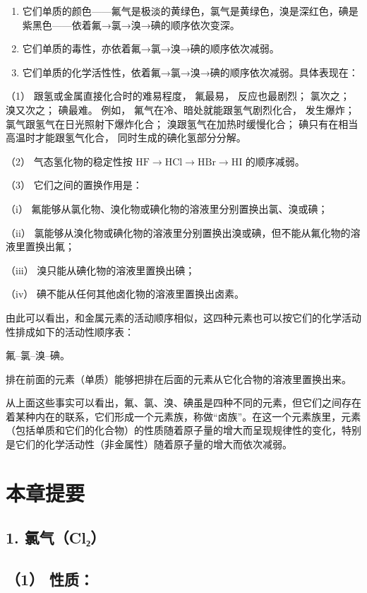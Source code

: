 \begin{enumerate}[start=2]
\item
  它们单质的颜色------氟气是极淡的黄绿色，氯气是黄绿色，溴是深红色，碘是紫黑色------依着氟→氯→溴→碘的顺序依次变深。
\item
  它们单质的毒性，亦依着氟→氯→溴→碘的顺序依次减弱。
\item
  它们单质的化学活性性，依着氟→氯→溴→碘的顺序依次减弱。具体表现在：
\end{enumerate}

（1） 跟氢或金属直接化合时的难易程度， 氟最易， 反应也最剧烈； 氯次之；
溴又次之； 碘最难。 例如， 氟气在冷、暗处就能跟氢气剧烈化合， 发生爆炸；
氯气跟氢气在日光照射下爆炸化合； 溴跟氢气在加热时缓慢化合；
碘只有在相当高温时才能跟氢气化合， 同时生成的碘化氢部分分解。

（2） 气态氢化物的稳定性按
\(\mathrm{HF} \rightarrow \mathrm{HCl} \rightarrow \mathrm{HBr} \rightarrow \mathrm{HI}\)
的顺序减弱。

（3） 它们之间的置换作用是：

（i） 氟能够从氯化物、溴化物或碘化物的溶液里分别置换出氯、溴或碘；

（ii）
氯能够从溴化物或碘化物的溶液里分别置换出溴或碘，但不能从氟化物的溶液里置换出氟；

（iii） 溴只能从碘化物的溶液里置换出碘；

（iv） 碘不能从任何其他卤化物的溶液里置换出卤素。

由此可以看出，和金属元素的活动顺序相似，这四种元素也可以按它们的化学活动性排成如下的活动性顺序表：

氟--氯--溴--碘。

排在前面的元素（单质）能够把排在后面的元素从它化合物的溶液里置换出来。

从上面这些事实可以看出，氟、氯、溴、碘虽是四种不同的元素，但它们之间存在着某种内在的联系，它们形成一个元素族，称做``卤族''。在这一个元素族里，元素（包括单质和它们的化合物）的性质随着原子量的增大而呈现规律性的变化，特别是它们的化学活动性（非金属性）随着原子量的增大而依次减弱。

\section{本章提要}

\subsection{1. 氯气（Cl₂）}

\subsection{（1） 性质：}


